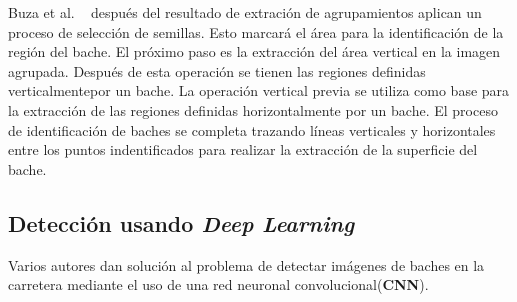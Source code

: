 Buza et al. ~ después del resultado de extración de agrupamientos aplican un proceso de selección de semillas.
Esto marcará el área para la identificación de la región del bache. El próximo paso es la extracción del área vertical en la imagen agrupada.
Después de esta operación se tienen las regiones definidas verticalmentepor un bache. La operación vertical previa se utiliza como base para 
la extracción de las regiones definidas horizontalmente por un bache. El proceso de identificación de baches se completa trazando líneas verticales 
y horizontales entre los puntos indentificados para realizar la extracción de la superficie del bache.


\subsection{Detección usando \emph{Deep Learning}}
 
Varios autores dan solución  al  problema de detectar imágenes de baches en la carretera mediante el uso de una red neuronal convolucional(\textbf{CNN}).







